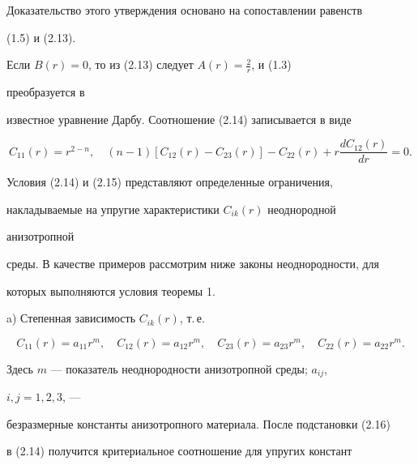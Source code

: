  


Доказательство этого утверждения основано на сопоставлении равенств


(1.5) и (2.13). 


 


\begin{note} 


Если $B(r)=0$, то из (2.13) следует $A(r)=\frac{2}{r}$, и (1.3) 


преобразуется в 


известное уравнение Дарбу. Соотношение (2.14) записывается в виде 


\begin{equation} 


C_{11}(r)=r^{2-n},\quad (n-1)[C_{12}(r)-C_{23}(r)] 


-C_{22}(r)+r\frac{d C_{12}(r)}{dr}=0. 


\end{equation} 


\end{note} 


 


Условия (2.14) и (2.15) представляют определенные ограничения, 


накладываемые на упругие характеристики $C_{ik}(r)$ неоднородной 


анизотропной 


среды. В качестве примеров рассмотрим ниже законы неоднородности, для 


которых выполняются условия теоремы 1. 


 


a) Степенная зависимость $C_{ik}(r)$, т.\,е. 


\begin{equation} 


C_{11}(r)=a_{11}r^m,\quad C_{12}(r)=a_{12}r^m,\quad 


C_{23}(r)=a_{23}r^m,\quad C_{22}(r)=a_{22}r^m. 


\end{equation} 


Здесь $m$ --- показатель неоднородности анизотропной среды; $a_{ij}$, 


$i,j=1,2,3$, --- 


безразмерные константы анизотропного материала. После подстановки (2.16) 


в (2.14) получится критериальное соотношение для упругих констант 


